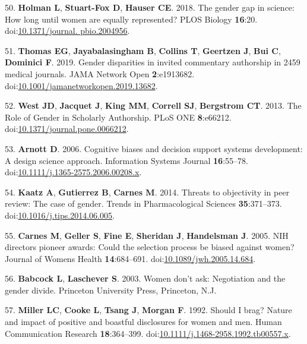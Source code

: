 \documentclass[11pt,]{article}
\begin{document}
\hypertarget{ref-holman_gender_2018}{}
50. \textbf{Holman L}, \textbf{Stuart-Fox D}, \textbf{Hauser CE}. 2018.
The gender gap in science: How long until women are equally represented?
PLOS Biology \textbf{16}:20.
doi:\href{https://doi.org/10.1371/journal.\%20pbio.2004956}{10.1371/journal. pbio.2004956}.

\hypertarget{ref-Thomas2019}{}
51. \textbf{Thomas EG}, \textbf{Jayabalasingham B}, \textbf{Collins T},
\textbf{Geertzen J}, \textbf{Bui C}, \textbf{Dominici F}. 2019. Gender
disparities in invited commentary authorship in 2459 medical journals.
JAMA Network Open \textbf{2}:e1913682.
doi:\href{https://doi.org/10.1001/jamanetworkopen.2019.13682}{10.1001/jamanetworkopen.2019.13682}.

\hypertarget{ref-west_role_2013}{}
52. \textbf{West JD}, \textbf{Jacquet J}, \textbf{King MM},
\textbf{Correll SJ}, \textbf{Bergstrom CT}. 2013. The Role of Gender in
Scholarly Authorship. PLoS ONE \textbf{8}:e66212.
doi:\href{https://doi.org/10.1371/journal.pone.0066212}{10.1371/journal.pone.0066212}.

\hypertarget{ref-Arnott2006}{}
53. \textbf{Arnott D}. 2006. Cognitive biases and decision support
systems development: A design science approach. Information Systems
Journal \textbf{16}:55--78.
doi:\href{https://doi.org/10.1111/j.1365-2575.2006.00208.x}{10.1111/j.1365-2575.2006.00208.x}.

\hypertarget{ref-Kaatz2014}{}
54. \textbf{Kaatz A}, \textbf{Gutierrez B}, \textbf{Carnes M}. 2014.
Threats to objectivity in peer review: The case of gender. Trends in
Pharmacological Sciences \textbf{35}:371--373.
doi:\href{https://doi.org/10.1016/j.tips.2014.06.005}{10.1016/j.tips.2014.06.005}.

\hypertarget{ref-Carnes2005}{}
55. \textbf{Carnes M}, \textbf{Geller S}, \textbf{Fine E},
\textbf{Sheridan J}, \textbf{Handelsman J}. 2005. NIH directors pioneer
awards: Could the selection process be biased against women? Journal of
Womens Health \textbf{14}:684--691.
doi:\href{https://doi.org/10.1089/jwh.2005.14.684}{10.1089/jwh.2005.14.684}.

\hypertarget{ref-babcock_women_2003}{}
56. \textbf{Babcock L}, \textbf{Laschever S}. 2003. Women don't ask:
Negotiation and the gender divide. Princeton University Press,
Princeton, N.J.

\hypertarget{ref-MILLER1992}{}
57. \textbf{Miller LC}, \textbf{Cooke L}, \textbf{Tsang J},
\textbf{Morgan F}. 1992. Should I brag? Nature and impact of positive
and boastful disclosures for women and men. Human Communication Research
\textbf{18}:364--399.
doi:\href{https://doi.org/10.1111/j.1468-2958.1992.tb00557.x}{10.1111/j.1468-2958.1992.tb00557.x}.
\end{document}
